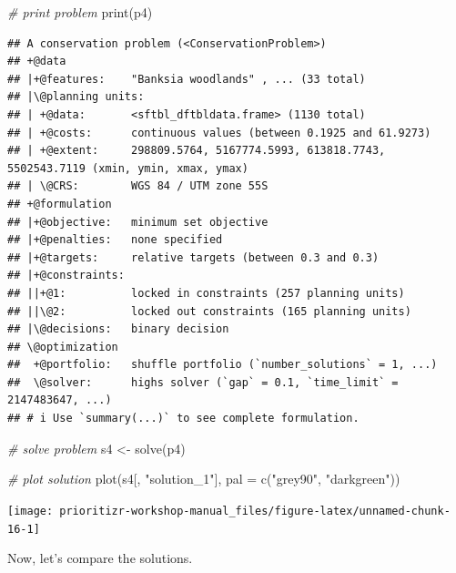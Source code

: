 \documentclass[
  12pt,
]{book}
\newenvironment{Shaded}{\begin{snugshade}}{\end{snugshade}}
\newcommand{\AttributeTok}[1]{\textcolor[rgb]{0.77,0.63,0.00}{#1}}
\newcommand{\CommentTok}[1]{\textcolor[rgb]{0.56,0.35,0.01}{\textit{#1}}}
\newcommand{\FunctionTok}[1]{\textcolor[rgb]{0.00,0.00,0.00}{#1}}
\newcommand{\NormalTok}[1]{#1}
\newcommand{\OtherTok}[1]{\textcolor[rgb]{0.56,0.35,0.01}{#1}}
\newcommand{\StringTok}[1]{\textcolor[rgb]{0.31,0.60,0.02}{#1}}
\begin{document}
\begin{Shaded}
\begin{Highlighting}[]
\CommentTok{\# print problem}
\FunctionTok{print}\NormalTok{(p4)}
\end{Highlighting}
\end{Shaded}

\begin{verbatim}
## A conservation problem (<ConservationProblem>)
## +@data
## |+@features:    "Banksia woodlands" , ... (33 total)
## |\@planning units:
## | +@data:       <sftbl_dftbldata.frame> (1130 total)
## | +@costs:      continuous values (between 0.1925 and 61.9273)
## | +@extent:     298809.5764, 5167774.5993, 613818.7743, 5502543.7119 (xmin, ymin, xmax, ymax)
## | \@CRS:        WGS 84 / UTM zone 55S
## +@formulation
## |+@objective:   minimum set objective
## |+@penalties:   none specified
## |+@targets:     relative targets (between 0.3 and 0.3)
## |+@constraints:
## ||+@1:          locked in constraints (257 planning units)
## ||\@2:          locked out constraints (165 planning units)
## |\@decisions:   binary decision
## \@optimization
##  +@portfolio:   shuffle portfolio (`number_solutions` = 1, ...)
##  \@solver:      highs solver (`gap` = 0.1, `time_limit` = 2147483647, ...)
## # i Use `summary(...)` to see complete formulation.
\end{verbatim}

\begin{Shaded}
\begin{Highlighting}[]
\CommentTok{\# solve problem}
\NormalTok{s4 }\OtherTok{\textless{}{-}} \FunctionTok{solve}\NormalTok{(p4)}

\CommentTok{\# plot solution}
\FunctionTok{plot}\NormalTok{(s4[, }\StringTok{"solution\_1"}\NormalTok{],  }\AttributeTok{pal =} \FunctionTok{c}\NormalTok{(}\StringTok{"grey90"}\NormalTok{, }\StringTok{"darkgreen"}\NormalTok{))}
\end{Highlighting}
\end{Shaded}

\begin{center}\texttt{[image: prioritizr-workshop-manual\_files/figure-latex/unnamed-chunk-16-1]} \end{center}

Now, let's compare the solutions.
\end{document}
